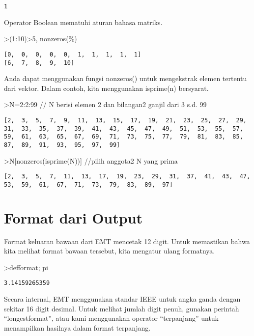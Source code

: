 \documentclass[
]{book}
\begin{document}
\begin{verbatim}
1
\end{verbatim}

Operator Boolean mematuhi aturan bahasa matriks.

\textgreater(1:10)\textgreater5, nonzeros(\%)

\begin{verbatim}
[0,  0,  0,  0,  0,  1,  1,  1,  1,  1]
[6,  7,  8,  9,  10]
\end{verbatim}

Anda dapat menggunakan fungsi nonzeros() untuk mengekstrak elemen tertentu dari vektor. Dalam contoh, kita menggunakan isprime(n) bersyarat.

\textgreater N=2:2:99 // N berisi elemen 2 dan bilangan2 ganjil dari 3 s.d. 99

\begin{verbatim}
[2,  3,  5,  7,  9,  11,  13,  15,  17,  19,  21,  23,  25,  27,  29,
31,  33,  35,  37,  39,  41,  43,  45,  47,  49,  51,  53,  55,  57,
59,  61,  63,  65,  67,  69,  71,  73,  75,  77,  79,  81,  83,  85,
87,  89,  91,  93,  95,  97,  99]
\end{verbatim}

\textgreater N{[}nonzeros(isprime(N)){]} //pilih anggota2 N yang prima

\begin{verbatim}
[2,  3,  5,  7,  11,  13,  17,  19,  23,  29,  31,  37,  41,  43,  47,
53,  59,  61,  67,  71,  73,  79,  83,  89,  97]
\end{verbatim}

\section{Format dari Output}\label{format-dari-output}

Format keluaran bawaan dari EMT mencetak 12 digit. Untuk memastikan bahwa kita melihat format bawaan tersebut, kita mengatur ulang formatnya.

\textgreater defformat; pi

\begin{verbatim}
3.14159265359
\end{verbatim}

Secara internal, EMT menggunakan standar IEEE untuk angka ganda dengan sekitar 16 digit desimal. Untuk melihat jumlah digit penuh, gunakan perintah ``longestformat'', atau kami menggunakan operator ``terpanjang'' untuk menampilkan hasilnya dalam format terpanjang.
\end{document}
